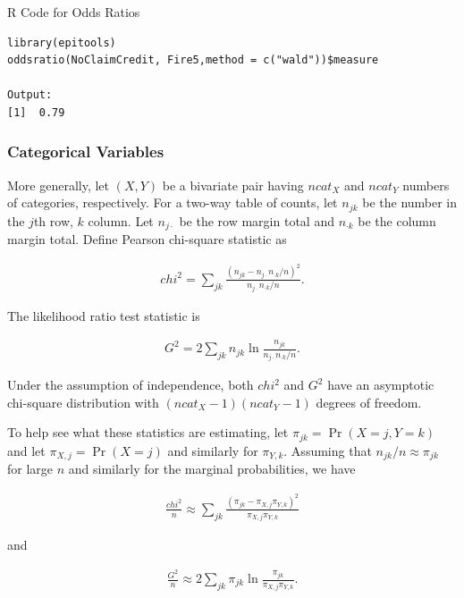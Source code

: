 \documentclass[]{book}
\theoremstyle{definition}
\theoremstyle{definition}
\theoremstyle{definition}
\theoremstyle{remark}
\begin{document}
R Code for Odds Ratios

\hypertarget{display.wald.2}{}
\begin{verbatim}
library(epitools)
oddsratio(NoClaimCredit, Fire5,method = c("wald"))$measure

Output:
[1]  0.79
\end{verbatim}

\subsubsection{Categorical Variables}\label{categorical-variables}

More generally, let \((X,Y)\) be a bivariate pair having \(ncat_X\) and
\(ncat_Y\) numbers of categories, respectively. For a two-way table of
counts, let \(n_{jk}\) be the number in the \(j\)th row, \(k\) column.
Let \(n_{j\cdot}\) be the row margin total and \(n_{\cdot k}\) be the
column margin total. Define Pearson chi-square statistic as

\begin{eqnarray*}
chi^2 = \sum_{jk} \frac{(n_{jk}- n_{j\cdot}n_{\cdot k}/n)^2}{n_{j\cdot}n_{\cdot k}/n} .
\end{eqnarray*}

The likelihood ratio test statistic is

\begin{eqnarray*}
G^2 = 2 \sum_{jk} n_{jk} \ln\frac{n_{jk}}{n_{j\cdot}n_{\cdot k}/n} .
\end{eqnarray*}

Under the assumption of independence, both \(chi^2\) and \(G^2\) have an
asymptotic chi-square distribution with \((ncat_X-1)(ncat_Y-1)\) degrees
of freedom.

To help see what these statistics are estimating, let
\(\pi_{jk} = \Pr(X=j, Y=k)\) and let \(\pi_{X,j}=\Pr(X=j)\) and
similarly for \(\pi_{Y,k}\). Assuming that \(n_{jk}/n \approx \pi_{jk}\)
for large \(n\) and similarly for the marginal probabilities, we have

\begin{eqnarray*}
\frac{chi^2}{n} \approx \sum_{jk} \frac{(\pi_{jk}- \pi_{X,j}\pi_{Y,k})^2}{\pi_{X,j}\pi_{Y,k}}
\end{eqnarray*}

and

\begin{eqnarray*}
\frac{G^2}{n} \approx 2 \sum_{jk} \pi_{jk} \ln\frac{\pi_{jk}}{\pi_{X,j}\pi_{Y,k}} .
\end{eqnarray*}
\end{document}
